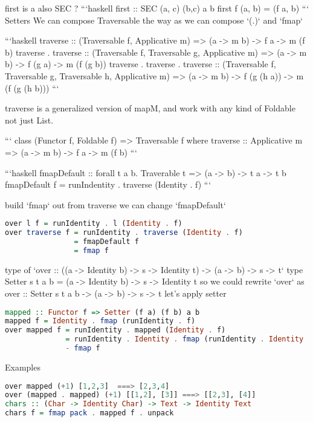 first is a also SEC ?
```haskell
first :: SEC (a, c) (b,c) a b
first f (a, b) = (f a, b)
```
Setters
We can compose Traversable the way as we can compose `(.)` and `fmap`

```haskell
traverse                       :: (Traversable f, Applicative m) => (a -> m b) -> f a -> m (f b)
traverse . traverse            :: (Traversable f, Traversable g, Applicative m) => (a -> m b) -> f (g a) -> m (f (g b))
traverse . traverse . traverse :: (Traversable f, Traversable g, Traversable h, Applicative m) => (a -> m b) -> f (g (h a)) -> m (f (g (h b)))
```

traverse is a generalized version of mapM, and work with any kind of Foldable not just List.

```
class (Functor f, Foldable f) => Traversable f where
   traverse :: Applicative m => (a -> m b) -> f a -> m (f b)
```

```haskell
fmapDefault :: forall t a b. Traverable t => (a -> b) -> t a -> t b
fmapDefault f = runIndentity . traverse (Identity . f)
```

build `fmap` out from traverse
we can change `fmapDefault`

\begin{lstlisting}[language=haskell]
over l f = runIdentity . l (Identity . f)
over traverse f = runIdentity . traverse (Identity . f)
                = fmapDefault f
                = fmap f
\end{lstlisting}

type of `over :: ((a -> Identity b) -> s -> Identity t) -> (a -> b) -> s -> t`
type Setter s t a b = (a -> Identity b) -> s -> Identity t
so we could rewrite `over` as
over :: Setter s t a b -> (a -> b) -> s -> t
let’s apply setter

\begin{lstlisting}[language=haskell]
mapped :: Functor f => Setter (f a) (f b) a b
mapped f = Identity . fmap (runIdentity . f)
over mapped f = runIdentity . mapped (Identity . f)
              = runIdentity . Identity . fmap (runIdentity . Identity . f)
              - fmap f
\end{lstlisting}

Examples

\begin{lstlisting}[language=haskell]
over mapped (+1) [1,2,3]  ===> [2,3,4]
over (mapped . mapped) (+1) [[1,2], [3]] ===> [[2,3], [4]]
chars :: (Char -> Identity Char) -> Text -> Identity Text
chars f = fmap pack . mapped f . unpack
\end{lstlisting}

